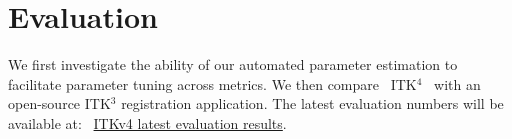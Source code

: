 \documentclass{frontiersSCNS}
\newcommand{\vect}[1]{\mathbf{#1}}
\renewcommand{\u}{\vect{u}}
\renewcommand{\v}{\vect{v}}
\newcommand{\tk}{~ITK$^{\text{4}}$~}
\begin{document}

\section{Evaluation}
We first investigate the ability of our automated parameter estimation
to facilitate parameter tuning across metrics.  We then compare \tk
with an open-source ITK$^3$ registration application.
The latest evaluation numbers will be available at:
~\textcolor{blue}{\href{https://github.com/ntustison/BSplineMorphisms}{ITKv4 latest
  evaluation results}}.
\end{document}
